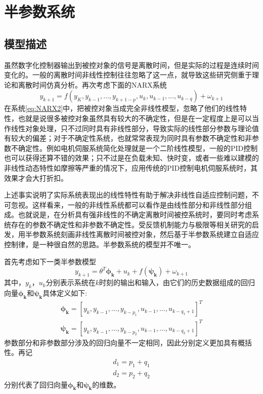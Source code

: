 \section{半参数系统}\label{sect:2.2}
\subsection{模型描述}\label{subsect:2.2.1}
虽然数字化控制器输出到被控对象的信号是离散时间，但是实际的过程是连续时间变化的。一般的离散时间非线性控制往往忽略了这一点，就导致这些研究侧重于理论和离散时间仿真分析。再次考虑下面的NARX系统
\begin{equation}%
\label{eq:NARX2}
y_{k+1} = f(y_{K},y_{k-1},\ldots,y_{k+1-p},u_{k},u_{k-1},\ldots,u_{k-q})+\omega_{k+1}
\end{equation}
在系统\eqref{eq:NARX2}中，把被控对象当成完全非线性模型，忽略了他们的线性特性，也就是说很多被控对象虽然具有较大的不确定性，但是在一定程度上是可以当作线性对象处理，只不过同时具有非线性部分，导致实际的线性部分参数与理论值有较大的偏差；对于不确定性系统，也就常常表现为同时具有参数不确定性和非参数不确定性。例如电机伺服系统简化处理就是一个二阶线性模型，一般的PID控制也可以获得还算不错的效果；只不过是在负载未知、快时变，或者一些难以建模的非线性动态特性如摩擦等严重的情况下，应用传统的PID控制电机伺服系统时，其效果才会大打折扣。

上述事实说明了实际系统表现出的线性特性有助于解决非线性自适应控制问题，不可忽视。这样看来，一般的非线性系统都可以看作是由线性部分和非线性部分组成。也就说是，在分析具有强非线性的不确定离散时间被控系统时，要同时考虑系统存在的参数不确定性和非参数不确定性。受反馈机制能力与极限等相关研究的启发，用半参数系统刻画非线性离散时间被控对象，然后基于半参数系统建立自适应控制律，是一种很自然的思路。半参数系统的模型并不唯一。

首先考虑如下一类半参数模型
\begin{equation}%
\label{eq:semi-u}
y_{k+1} = \theta^{T}\bm{\phi_{k}}+u_{k}+f(\bm{\psi_{k}})+\omega_{k+1}
\end{equation}
其中，$y_{k}$，$u_{k}$分别表示系统在$k$时刻的输出和输入，由它们的历史数据组成的回归向量$\bm{\phi_{k}}$和$\bm{\psi_{k}}$具体定义如下:
\begin{eqnarray}
\bm{\phi_{k}}=[y_{k},y_{k-1},\ldots,y_{k-p_{1}},u_{k-1},\dots,u_{k-q_{1}+1}]^{T}\\
\bm{\psi_{k}}=[y_{k},y_{k-1},\ldots,y_{k-p_{2}},u_{k-1},\dots,u_{k-q_{2}+1}]^{T}
\end{eqnarray}
参数部分和非参数部分涉及的回归向量不一定相同，因此分别定义更加具有概括性。再记
\begin{eqnarray}
d_{1}=p_{1}+q_{1}\\
d_{2}=p_{2}+q_{2}
\end{eqnarray}
分别代表了回归向量$\bm{\phi_{k}}$和$\bm{\psi_{k}}$的维数。

